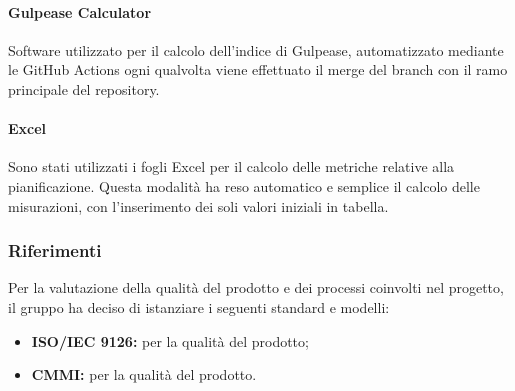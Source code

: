 \paragraph{Gulpease Calculator}
Software utilizzato per il calcolo dell'indice di Gulpease, automatizzato mediante le GitHub Actions ogni qualvolta viene effettuato il merge del branch con il ramo principale del repository.

\paragraph{Excel}
Sono stati utilizzati i fogli Excel per il calcolo delle metriche relative alla pianificazione. Questa modalità ha reso automatico e semplice il calcolo delle misurazioni, con l'inserimento dei soli valori iniziali in tabella. 


\subsubsection{Riferimenti}
Per la valutazione della qualità del prodotto e dei processi coinvolti nel progetto, il gruppo ha deciso di istanziare i seguenti standard e modelli:
\begin{itemize}
	\item \textbf{ISO/IEC 9126:} per la qualità del prodotto;
	\item \textbf{CMMI:} per la qualità del prodotto.
\end{itemize}
